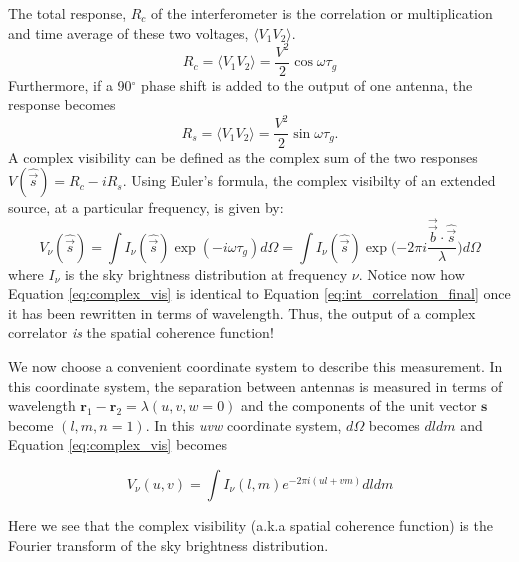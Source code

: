 The total response, $R_c$ of the interferometer is the correlation or multiplication and time average of these two voltages, $\langle V_1 V_2 \rangle$. 
$$
R_c = \langle V_1 V_2 \rangle = \frac{V^2}{2} \cos{\omega \tau_g}
$$
Furthermore, if a 90$^\circ$ phase shift is added to the output of one antenna, the response becomes
$$
R_s = \langle V_1 V_2 \rangle = \frac{V^2}{2} \sin{\omega \tau_g}.
$$
A complex visibility can be defined as the complex sum of the two responses $V(\hat{\Vec{s}}) = R_c - iR_s$. Using Euler's formula, the complex visibilty of an extended source, at a particular frequency, is given by:
\begin{equation}
\label{eq:complex_vis}
V_\nu(\hat{\Vec{s}}) = \int I_\nu(\hat{\Vec{s}}) \exp{(-i \omega \tau_g)} d\Omega = \int I_\nu(\hat{\Vec{s}}) \exp{(-2 \pi i \frac{\overrightarrow{\Vec{b}} \cdot \hat{\Vec{s}}}{\lambda}}) d\Omega
\end{equation}
where $I_\nu$ is the sky brightness distribution at frequency $\nu$. Notice now how Equation \ref{eq:complex_vis} is identical to Equation \ref{eq:int_correlation_final} once it has been rewritten in terms of wavelength. Thus, the output of a complex correlator \textit{is} the spatial coherence function!

We now choose a convenient coordinate system to describe this measurement. In this coordinate system, the separation between antennas is measured in terms of wavelength $\mathbf{r}_1 - \mathbf{r}_2 = \lambda(u, v, w=0)$ and the components of the unit vector $\mathbf{s}$ become $(l, m, n = 1)$. In this \textit{uvw} coordinate system, $d\Omega$ becomes $dl dm$ and Equation \ref{eq:complex_vis} becomes

\begin{equation}
\label{eq:complex_vis_uvw}
V_\nu(u,v) = \int I_\nu(l,m) e^{-2 \pi i (ul + vm)} dl dm
\end{equation}

Here we see that the complex visibility (a.k.a spatial coherence function) is the Fourier transform of the sky brightness distribution.


